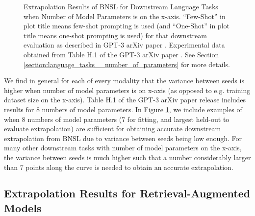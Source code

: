 \documentclass{article} %
\begin{document}
\begin{figure}[htbp]
    \caption{
Extrapolation Results of BNSL for Downstream Language Tasks when Number of Model Parameters is on the x-axis. ``Few-Shot'' in plot title means few-shot prompting is used (and ``One-Shot'' in plot title means one-shot prompting is used) for that downstream evaluation as described in GPT-3 arXiv paper \citep{brown2020language}. Experimental data obtained from Table H.1 of the GPT-3 arXiv paper \citep{brown2020language}.
See Section \ref{section:language_tasks__number_of_parameters} for more details.
    }
    \label{fig:language_tasks__number_of_parameters}
\end{figure}

We find in general for each of every modality that the variance between seeds is higher when number of model parameters is on x-axis (as opposed to e.g. training dataset size on the x-axis). Table H.1 of the GPT-3 arXiv paper \citep{brown2020language} release includes results for 8 numbers of model parameters. In Figure \ref{fig:language_tasks__number_of_parameters}, we include examples of when 8 numbers of model parameters (7 for fitting, and largest held-out to evaluate extrapolation) are sufficient for obtaining accurate downstream extrapolation from BNSL due to variance between seeds being low enough. For many other downstream tasks with number of model parameters on the x-axis, the variance between seeds is much higher such that a number considerably larger than 7 points along the curve is needed to obtain an accurate extrapolation.

\clearpage

\subsection{Extrapolation Results for Retrieval-Augmented Models}
\label{section:retrieval}

\vspace{-3.5mm}
\end{document}
